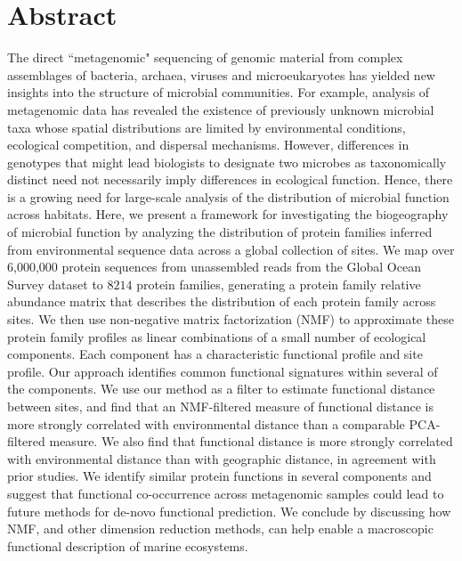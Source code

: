 \section{Abstract}

The direct ``metagenomic" sequencing of genomic material from complex assemblages of bacteria, archaea, viruses and microeukaryotes has yielded new insights into the structure of microbial communities.  For example, analysis of metagenomic data has revealed the existence of previously unknown microbial taxa whose spatial distributions are limited by environmental conditions, ecological competition, and dispersal mechanisms.  However, differences in genotypes that might lead biologists to designate two microbes as taxonomically distinct need not necessarily imply differences in ecological function.  Hence, there is a growing need for large-scale analysis of the distribution of microbial function across habitats. Here, we present a framework for investigating the biogeography of microbial function by analyzing the distribution of protein families inferred from environmental sequence data across a global collection of sites.  We map over 6,000,000 protein sequences from unassembled reads from the Global Ocean Survey dataset to $8214$ protein families, generating a protein family relative abundance matrix that describes the distribution of each protein family across sites.  We then use non-negative matrix factorization (NMF) to approximate these protein family profiles as linear combinations of a small number of ecological components. Each component has a characteristic functional profile and site profile.  Our approach identifies common functional signatures within several of the components. We use our method as a filter to estimate functional distance between sites, and find that an NMF-filtered measure of functional distance is more strongly correlated with environmental distance than a comparable PCA-filtered measure.  We also find that functional distance is more strongly correlated with environmental distance than with geographic distance, in agreement with prior studies. We identify similar protein functions in several components and suggest that functional co-occurrence across metagenomic samples could lead to future methods for de-novo functional prediction. We conclude by discussing how NMF, and other dimension reduction methods, can help enable a macroscopic functional description of marine ecosystems.

